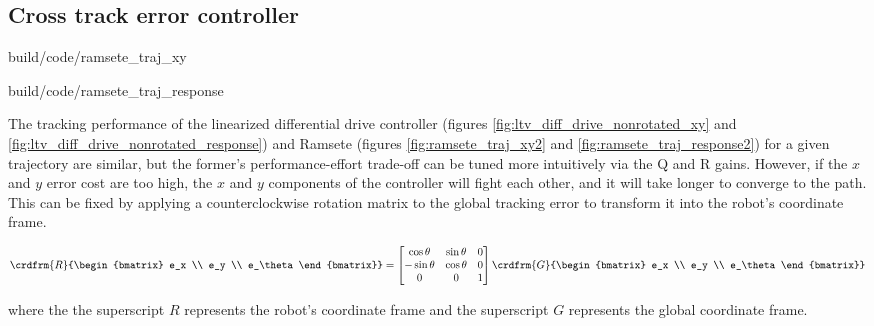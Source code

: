 \subsection{Cross track error controller}

\begin{bookfigure}
  \begin{minisvg}{2}{build/code/ramsete_traj_xy}
    \caption{Ramsete nonlinear controller x-y plot}
    \label{fig:ramsete_traj_xy2}
  \end{minisvg}
  \hfill
  \begin{minisvg}{2}{build/code/ramsete_traj_response}
    \caption{Ramsete nonlinear controller response}
    \label{fig:ramsete_traj_response2}
  \end{minisvg}
\end{bookfigure}

The tracking performance of the linearized differential drive controller
(figures \ref{fig:ltv_diff_drive_nonrotated_xy} and
\ref{fig:ltv_diff_drive_nonrotated_response}) and Ramsete (figures
\ref{fig:ramsete_traj_xy2} and \ref{fig:ramsete_traj_response2}) for a given
trajectory are similar, but the former's performance-effort trade-off can be
tuned more intuitively via the Q and R gains. However, if the $x$ and $y$ error
cost are too high, the $x$ and $y$ components of the controller will fight each
other, and it will take longer to converge to the path. This can be fixed by
applying a counterclockwise rotation matrix to the global tracking error to
transform it into the robot's coordinate frame.

\begin{equation*}
  \crdfrm{R}{\begin{bmatrix}
    e_x \\
    e_y \\
    e_\theta
  \end{bmatrix}} =
  \begin{bmatrix}
    \cos\theta & \sin\theta & 0 \\
    -\sin\theta & \cos\theta & 0 \\
    0 & 0 & 1
  \end{bmatrix}
  \crdfrm{G}{\begin{bmatrix}
    e_x \\
    e_y \\
    e_\theta
  \end{bmatrix}}
\end{equation*}

where the the superscript $R$ represents the robot's coordinate frame and the
superscript $G$ represents the global coordinate frame.


